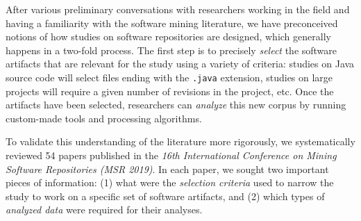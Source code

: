 After various preliminary conversations with researchers working in the field
and having a familiarity with the software mining literature, we have
preconceived notions of how studies on software repositories are designed,
which generally happens in a two-fold process.
The first step is to precisely
\emph{select} the software artifacts that are relevant for the study using a
variety of criteria: studies on Java source code will select files ending with
the \texttt{.java} extension, studies on large projects will require a given
number of revisions in the project, etc. Once the artifacts have been selected,
researchers can \emph{analyze} this new corpus by running custom-made tools and
processing algorithms.

To validate this understanding of the literature more rigorously, we
systematically reviewed 54 papers published in the \emph{16th International
Conference on Mining Software Repositories (MSR 2019)}. In each paper, we
sought two important pieces of information: (1) what were the \emph{selection
criteria} used to narrow the study to work on a specific set of software
artifacts, and (2) which types of \emph{analyzed data} were required for their
analyses.

